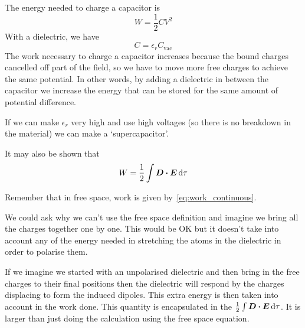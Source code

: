 \documentclass[12pt,chapterprefix=false,dvipsnames]{scrbook}
\theoremstyle{dotless}
\theoremstyle{definition}
\begin{document}
The energy needed to charge a capacitor is
\begin{equation}
	W = \frac{1}{2} CV^2
\end{equation}
With a dielectric, we have
\begin{equation}
	C = \epsilon_r C_{\mathrm{vac}}
\end{equation}
The work necessary to charge a capacitor increases because the
bound charges cancelled off part of the field, so we have to
move more free charges to achieve the same potential. In other
words, by adding a dielectric in between the capacitor we
increase the energy that can be stored for the same amount of
potential difference.

If we can make $\epsilon_r$ very high and use high
voltages (so there is no breakdown in the material) we can make
a `supercapacitor'.

It may also be shown that
\begin{equation}
	\label{eq:work_done_dielectric}
	W = \frac{1}{2}\int\bm{D}\vdot
	\bm{E}\dd{\tau}
\end{equation}

Remember that in free space, work is given
by~\ref{eq:work_continuous}.

We could ask why we can't use the free space definition and
imagine we bring all the charges together one by one. This would
be OK but it doesn't take into account any of the energy needed
in stretching the atoms in the dielectric in order to polarise
them.

If we imagine we started with an unpolarised dielectric and then
bring in the free charges to their final positions then the
dielectric will respond by the charges displacing to form the
induced dipoles. This extra energy is then taken into account in
the work done. This quantity is encapsulated in the
$\frac{1}{2}\int\bm{D}
	\vdot\bm{E}\dd{\tau}$. It is larger than just doing the
calculation using the free space equation.
\end{document}
